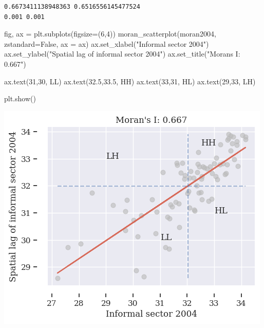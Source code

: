 \documentclass[
  letterpaper,
  DIV=11,
  numbers=noendperiod]{scrreprt}
\newenvironment{Shaded}{\begin{snugshade}}{\end{snugshade}}
\newcommand{\DecValTok}[1]{\textcolor[rgb]{0.68,0.00,0.00}{#1}}
\newcommand{\FloatTok}[1]{\textcolor[rgb]{0.68,0.00,0.00}{#1}}
\newcommand{\NormalTok}[1]{\textcolor[rgb]{0.00,0.23,0.31}{#1}}
\newcommand{\OperatorTok}[1]{\textcolor[rgb]{0.37,0.37,0.37}{#1}}
\newcommand{\StringTok}[1]{\textcolor[rgb]{0.13,0.47,0.30}{#1}}
\newcommand{\VariableTok}[1]{\textcolor[rgb]{0.07,0.07,0.07}{#1}}
\begin{document}
\begin{verbatim}
0.6673411138948363 0.6516556145477524
0.001 0.001
\end{verbatim}

\begin{Shaded}
\begin{Highlighting}[]
\NormalTok{fig, ax }\OperatorTok{=}\NormalTok{ plt.subplots(figsize}\OperatorTok{=}\NormalTok{(}\DecValTok{6}\NormalTok{,}\DecValTok{4}\NormalTok{))}
\NormalTok{moran\_scatterplot(moran2004, zstandard}\OperatorTok{=}\VariableTok{False}\NormalTok{, ax }\OperatorTok{=}\NormalTok{ ax)}
\NormalTok{ax.set\_xlabel(}\StringTok{"Informal sector 2004"}\NormalTok{)}
\NormalTok{ax.set\_ylabel(}\StringTok{"Spatial lag of informal sector 2004"}\NormalTok{)}
\NormalTok{ax.set\_title(}\StringTok{"Moran\textquotesingle{}s I: 0.667"}\NormalTok{)}

\NormalTok{ax.text(}\DecValTok{31}\NormalTok{,}\DecValTok{30}\NormalTok{, }\StringTok{\textquotesingle{}LL\textquotesingle{}}\NormalTok{)}
\NormalTok{ax.text(}\FloatTok{32.5}\NormalTok{,}\FloatTok{33.5}\NormalTok{, }\StringTok{\textquotesingle{}HH\textquotesingle{}}\NormalTok{)}
\NormalTok{ax.text(}\DecValTok{33}\NormalTok{,}\DecValTok{31}\NormalTok{, }\StringTok{\textquotesingle{}HL\textquotesingle{}}\NormalTok{)}
\NormalTok{ax.text(}\DecValTok{29}\NormalTok{,}\DecValTok{33}\NormalTok{, }\StringTok{\textquotesingle{}LH\textquotesingle{}}\NormalTok{)}


\NormalTok{plt.show()}
\end{Highlighting}
\end{Shaded}

\includegraphics{labs/final_informal_files/figure-pdf/cell-17-output-1.png}
\end{document}
